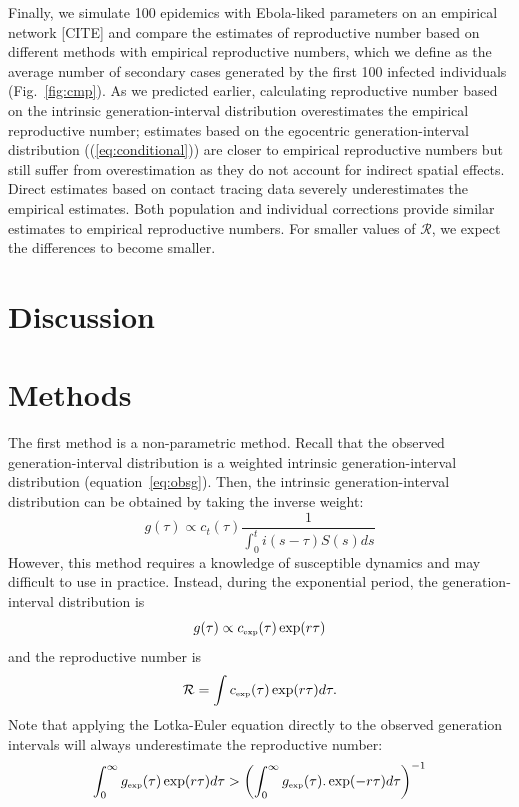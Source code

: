 \documentclass[12pt]{article}
\newcommand{\eref}[1]{(\ref{eq:#1})}
\newcommand{\fref}[1]{Fig.~\ref{fig:#1}}
\newcommand{\RR}{\ensuremath{{\mathcal R}}}
\newcommand{\tsub}[2]{#1_{{\textrm{\tiny #2}}}}
\begin{document}
Finally, we simulate 100 epidemics with Ebola-liked parameters on an empirical network [CITE] and compare the estimates of reproductive number based on different methods with empirical reproductive numbers, which we define as the average number of secondary cases generated by the first 100 infected individuals (\fref{cmp}).
As we predicted earlier, calculating reproductive number based on the intrinsic generation-interval distribution overestimates the empirical reproductive number;
estimates based on the egocentric generation-interval distribution (\eref{conditional}) are closer to empirical reproductive numbers but still suffer from overestimation as they do not account for indirect spatial effects.
Direct estimates based on contact tracing data severely underestimates the empirical estimates.
Both population and individual corrections provide similar estimates to empirical reproductive numbers.
For smaller values of \RR, we expect the differences to become smaller. 

\clearpage

\section{Discussion}

\section{Methods}

The first method is a non-parametric method.
Recall that the observed generation-interval distribution is a weighted intrinsic generation-interval distribution (equation~\ref{eq:obsg}). 
Then, the intrinsic generation-interval distribution can be obtained by taking the inverse weight:
\begin{equation}
g(\tau) \propto c_t(\tau) \frac{1}{\int_{0}^t i(s-\tau) S(s) ds}
\end{equation}
However, this method requires a knowledge of susceptible dynamics and may difficult to use in practice.
Instead, during the exponential period, the generation-interval distribution is
\begin{equation}
g(\tau) \propto \tsub{c}{exp}(\tau) \exp(r\tau)
\end{equation}
and the reproductive number is
\begin{equation}
\RR = \int \tsub{c}{exp}(\tau) \exp(r\tau) d\tau.
\end{equation}
Note that applying the Lotka-Euler equation directly to the observed generation intervals will always underestimate the reproductive number:
\begin{equation}
\int_0^\infty \tsub{g}{exp}(\tau) \exp(r\tau) d\tau > \left(\int_0^\infty \tsub{g}{exp}(\tau). \exp(-r\tau) d\tau\right)^{-1}
\end{equation}
\end{document}

